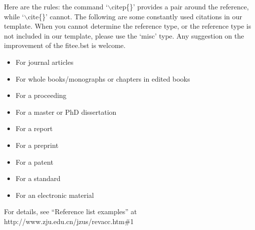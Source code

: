 \documentclass[twoside,twocolumn]{article}
\begin{document}
Here are the rules: the command `$\backslash$citep\{\}' provides a pair
around the reference, while `$\backslash$cite\{\}' cannot. The
following are some constantly used citations in our template. When
you cannot determine the reference type, or the reference type is
not included in our template, please use the `misc' type. Any
suggestion on the improvement of the fitee.bst is welcome.
\begin{itemize}
\itemsep -1pt
\item For journal articles \citep{Kampf02, TWFS03, Yu10}
\item For whole books/monographs or chapters in edited books \citep{Prigogine76}
\item For a proceeding \citep{GQMPSD06}
\item For a master or PhD dissertation \citep{Rizvi06}
\item For a report \citep{Sweeney00}
\item For a preprint \citep{WAWYCZM08}
\item For a patent \citep{Cookson85}
\item For a standard \citep{ISO82}
\item For an electronic material \citep{Sheffield01}
\end{itemize}

For details, see ``Reference list examples'' at http://www.zju.edu.cn/jzus/revacc.htm\#1




\end{document}
